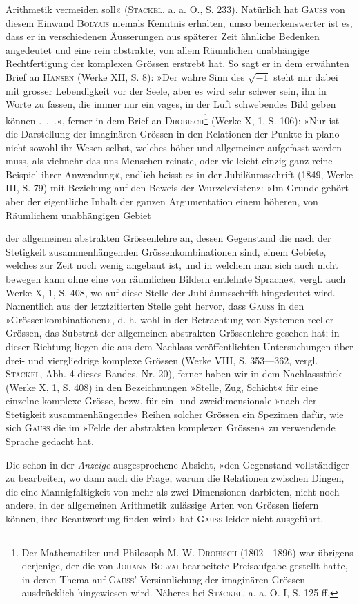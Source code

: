 Arithmetik vermeiden soll« (\textsc{Stäckel}, a. a. O., S. 233). Natürlich hat \textsc{Gauss}
von diesem Einwand \textsc{Bolyais} niemals Kenntnis erhalten, umso bemerkenswerter
ist es, dass er in verschiedenen Äusserungen aus späterer Zeit ähnliche Bedenken
angedeutet und eine rein abstrakte, von allem Räumlichen unabhängige
Rechtfertigung der komplexen Grössen erstrebt hat. So sagt er in dem erwähnten
Brief an \textsc{Hansen} (Werke XII, S. 8): »Der wahre Sinn des \(\sqrt{-1}\)
steht mir dabei mit grosser Lebendigkeit vor der Seele, aber es wird sehr
schwer sein, ihn in Worte zu fassen, die immer nur ein vages, in der Luft
schwebendes Bild geben können .\ .\ .«, ferner in dem Brief an \textsc{Drobisch}\footnote{Der Mathematiker und Philosoph \textsc{M. W. Drobisch} (1802—1896) war übrigens derjenige, der die
von \textsc{Johann Bolyai} bearbeitete Preisaufgabe gestellt hatte, in deren Thema auf \textsc{Gauss’} Versinnlichung
der imaginären Grössen ausdrücklich hingewiesen wird. Näheres bei \textsc{Stäckel}, a. a. O. I, S. 125 ff.}
(Werke X, 1, S. 106): »Nur ist die Darstellung der imaginären Grössen in den
Relationen der Punkte in plano nicht sowohl ihr Wesen selbst, welches höher
und allgemeiner aufgefasst werden muss, als vielmehr das uns Menschen reinste,
oder vielleicht einzig ganz reine Beispiel ihrer Anwendung«, endlich heisst es
in der Jubiläumsschrift (1849, Werke III, S. 79) mit Beziehung auf den Beweis
der Wurzelexistenz: »Im Grunde gehört aber der eigentliche Inhalt der
ganzen Argumentation einem höheren, von Räumlichem unabhängigen Gebiet\par
\clearpage{}
\noindent der allgemeinen abstrakten Grössenlehre an, dessen Gegenstand die nach der
Stetigkeit zusammenhängenden Grössenkombinationen sind, einem Gebiete, welches
zur Zeit noch wenig angebaut ist, und in welchem man sich auch nicht
bewegen kann ohne eine von räumlichen Bildern entlehnte Sprache«, vergl.
auch Werke X, 1, S. 408, wo auf diese Stelle der Jubiläumsschrift hingedeutet
wird. Namentlich aus der letztzitierten Stelle geht hervor, dass \textsc{Gauss} in den
»Grössenkombinationen«, d. h. wohl in der Betrachtung von Systemen reeller
Grössen, das Substrat der allgemeinen abstrakten Grössenlehre gesehen hat;
in dieser Richtung liegen die aus dem Nachlass veröffentlichten Untersuchungen
über drei- und viergliedrige komplexe Grössen (Werke VIII, S. 353—362,
vergl. \textsc{Stäckel}, Abh. 4 dieses Bandes, Nr. 20), ferner haben wir in dem
Nachlassstück (Werke X, 1, S. 408) in den Bezeichnungen »Stelle, Zug, Schicht«
für eine einzelne komplexe Grösse, bezw. für ein- und zweidimensionale »nach
der Stetigkeit zusammenhängende« Reihen solcher Grössen ein Spezimen dafür,
wie sich \textsc{Gauss} die im »Felde der abstrakten komplexen Grössen« zu verwendende
Sprache gedacht hat.

Die schon in der \textit{Anzeige} ausgesprochene Absicht, »den Gegenstand vollständiger
zu bearbeiten, wo dann auch die Frage, warum die Relationen zwischen
Dingen, die eine Mannigfaltigkeit von mehr als zwei Dimensionen darbieten,
nicht noch andere, in der allgemeinen Arithmetik zulässige Arten von
Grössen liefern können, ihre Beantwortung finden wird« hat \textsc{Gauss} leider nicht
ausgeführt.
